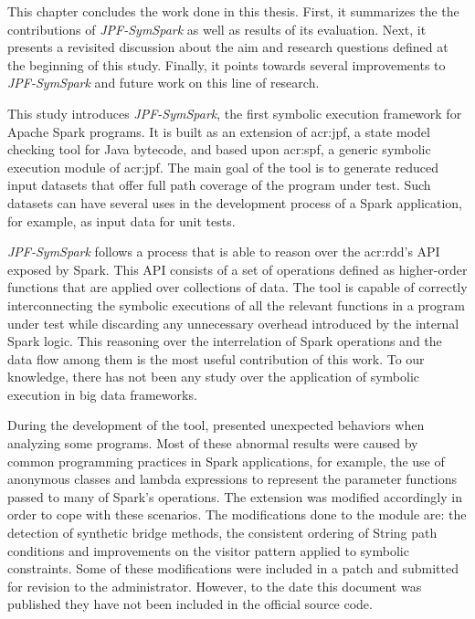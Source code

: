 
This chapter concludes the work done in this thesis. First, it summarizes the the contributions of \textit{JPF-SymSpark} as well as results of its evaluation. Next, it presents a revisited discussion about the aim and research questions defined at the beginning of this study. Finally, it points towards several improvements to \textit{JPF-SymSpark} and future work on this line of research.


This study introduces \textit{JPF-SymSpark}, the first symbolic execution framework for Apache Spark programs. It is built as an extension of \acrfull{acr:jpf}, a state model checking tool for Java bytecode, and based upon \acrfull{acr:spf}, a generic symbolic execution module of \acrshort{acr:jpf}. The main goal of the tool is to generate reduced input datasets that offer full path coverage of the program under test. Such datasets can have several uses in the development process of a Spark application, for example, as input data for unit tests. 

\textit{JPF-SymSpark} follows a process that is able to reason over the \acrshort{acr:rdd}'s API exposed by Spark. This API consists of a set of operations defined as higher-order functions that are applied over collections of data. The tool is capable of correctly interconnecting the symbolic executions of all the relevant functions in a program under test while discarding any unnecessary overhead introduced by the internal Spark logic. This reasoning over the interrelation of Spark operations and the data flow among them is the most useful contribution of this work. To our knowledge, there has not been any study over the application of symbolic execution in big data frameworks.

During the development of the tool, \spf{} presented unexpected behaviors when analyzing some programs. Most of these abnormal results were caused by common programming practices in Spark applications, for example, the use of anonymous classes and lambda expressions to represent the parameter functions passed to many of Spark's operations. The \spf{} extension was modified accordingly in order to cope with these scenarios. The modifications done to the \spf{} module are: the detection of synthetic bridge methods, the consistent ordering of String path conditions and improvements on the visitor pattern applied to symbolic constraints. Some of these modifications were included in a patch and submitted for revision to the \spf{} administrator. However, to the date this document was published they have not been included in the official source code.


